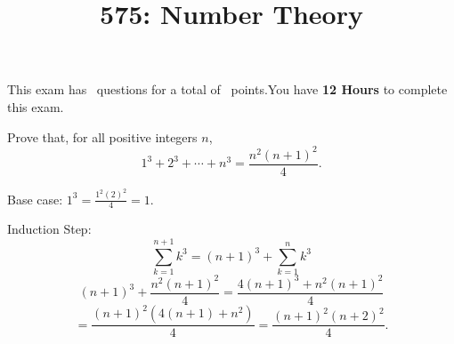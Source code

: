 

\usepackage{color}
\lstset{numbers=left}


\printanswers

\title{575: Number Theory}
\maketitle



\begin{center}
    This exam has \numquestions\ questions for a total of \numpoints\
    points.You have {\bf 12 Hours} to complete this exam.
\end{center}


\begin{questions}

    \question[5] Prove that, for all positive integers $n$,
        $$1^3 + 2^3 + \cdots + n^3 = \frac{n^2(n+1)^2}{4}.$$
    \begin{solution}
        Base case: $1^3 = \frac{1^2(2)^2}{4} = 1$.

        Induction Step: 
        $$\sum_{k=1}^{n+1} k^3 = (n+1)^3 + \sum_{k=1}^n k^3$$
        $$  (n+1)^3 + \frac{n^2(n+1)^2}{4}
          = \frac{ 4(n+1)^3 + n^2(n+1)^2 }{4}$$
        $$ = \frac{ (n+1)^2 ( 4(n+1) + n^2 ) }{4}
           = \frac{ (n+1)^2 (n+2)^2 }{4}.$$        
    \end{solution}


    \question


\end{questions}
